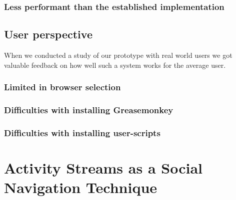 \subsubsection{Less performant than the established implementation}

\subsection{User perspective}

When we conducted a study of our prototype with real world users
we got valuable feedback on how well such a system works for the average user.

\subsubsection{Limited in browser selection}

\subsubsection{Difficulties with installing Greasemonkey}

\subsubsection{Difficulties with installing user-scripts}


\section{Activity Streams as a Social Navigation Technique}
